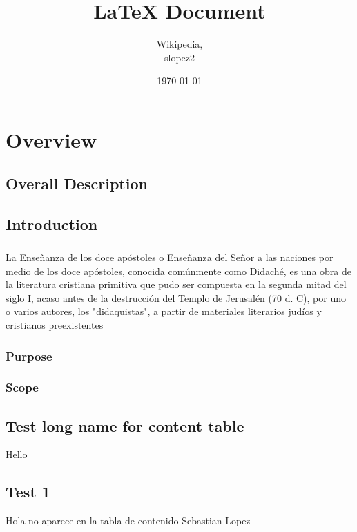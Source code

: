 \documentclass{book}
\title{LaTeX Document}
\author{Wikipedia, \\ slopez2}
\date{\today}
\begin{document}
	\maketitle
	\tableofcontents
	\chapter{Overview} %
	
	\section{Overall Description}
	
	\section{Introduction}
	\paragraph{}
	La Enseñanza de los doce apóstoles o Enseñanza del Señor a las naciones por medio de los doce apóstoles, conocida comúnmente como Didaché, es una obra de la literatura cristiana primitiva que pudo ser compuesta en la segunda mitad del siglo I, acaso antes de la destrucción del Templo de Jerusalén (70 d. C), por uno o varios autores, los "didaquistas", a partir de materiales literarios judíos y cristianos preexistentes
	\subsection{Purpose}
	
	\subsection{Scope}
	\section[short name]{Test long name for content table}
	Hello
	\section*{Test 1}
	Hola no aparece en la tabla de \textendash contenido \textemdash Sebastian Lopez
\end{document}
